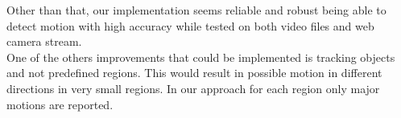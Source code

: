 \documentclass[12pt,a4paper,twocolumn]{article}
\begin{document}
Other than that, our implementation seems reliable and robust being able to detect motion with high accuracy while tested on both video files and web camera stream.\\
One of the others improvements that could be implemented is tracking objects and not predefined regions. This would result in possible motion in different directions in very small regions. In our approach for each region only major motions are reported.
\end{document}
